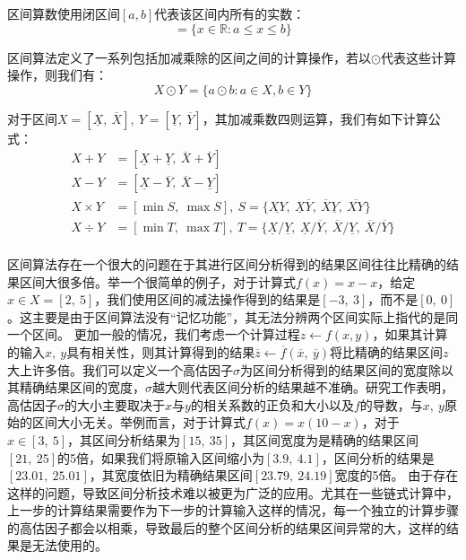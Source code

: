 区间算数使用闭区间$[a, b]$代表该区间内所有的实数：
\begin{equation*}
    [a, b] = \{x \in \mathbb{R} : a \leq x \leq b \}
\end{equation*}

区间算法定义了一系列包括加减乘除的区间之间的计算操作，若以$\odot$代表这些计算操作，则我们有：
\begin{equation*}
    X \odot Y = \{ a \odot b : a \in X , b \in Y \}
\end{equation*}

对于区间$X = [\underline{X},\ \overline{X}],\ Y = [\underline{Y},\  \overline{Y}]$，其加减乘数四则运算，我们有如下计算公式：
\begin{align*}
    X + Y & = [\underline{X} + \underline{Y},\ \overline{X} + \overline{Y}] \\
    X - Y & = [\underline{X} - \overline{Y},\ \overline{X} - \underline{Y}] \\
    X \times Y & = [\min S ,\ \max S],\ S = \{\underline{XY},\ \underline{X}\overline{Y},\ \overline{X}\underline{Y},\ \overline{XY}\} \\
    X \div Y & = [\min T,\ \max T],\ T = \{\underline{X}/\underline{Y},\ \underline{X}/\overline{Y},\ \overline{X}/\underline{Y},\ \overline{X}/\overline{Y} \} \\
\end{align*}

区间算法存在一个很大的问题在于其进行区间分析得到的结果区间往往比精确的结果区间大很多倍。举一个很简单的例子，对于计算式$f(x) = x - x$，给定$x \in X = [2,\ 5]$，我们使用区间的减法操作得到的结果是$[-3,\ 3]$，而不是$[0,\ 0]$。这主要是由于区间算法没有“记忆功能”，其无法分辨两个区间实际上指代的是同一个区间。
更加一般的情况，我们考虑一个计算过程$z \leftarrow f(x, y)$，如果其计算的输入$x,\  y$具有相关性，则其计算得到的结果$\overline{z} \leftarrow \overline{f}(\overline{x},\ \overline{y})$将比精确的结果区间$z$大上许多倍。我们可以定义一个高估因子$\sigma$为区间分析得到的结果区间的宽度除以其精确结果区间的宽度，$\sigma$越大则代表区间分析的结果越不准确。研究工作表明，高估因子$\sigma$的大小主要取决于$x$与$y$的相关系数的正负和大小以及$f$的导数，与$x,\ y$原始的区间大小无关。举例而言，对于计算式$f(x)=x(10-x)$，对于$x \in [3,\ 5]$，其区间分析结果为$[15,\ 35]$，其区间宽度为是精确的结果区间$[21,\ 25]$的5倍，如果我们将原输入区间缩小为$[3.9,\ 4.1]$，区间分析的结果是$[23.01,\ 25.01]$，其宽度依旧为精确结果区间$[23.79,\ 24.19]$宽度的5倍。
由于存在这样的问题，导致区间分析技术难以被更为广泛的应用。尤其在一些链式计算中，上一步的计算结果需要作为下一步的计算输入这样的情况，每一个独立的计算步骤的高估因子都会以相乘，导致最后的整个区间分析的结果区间异常的大，这样的结果是无法使用的。

